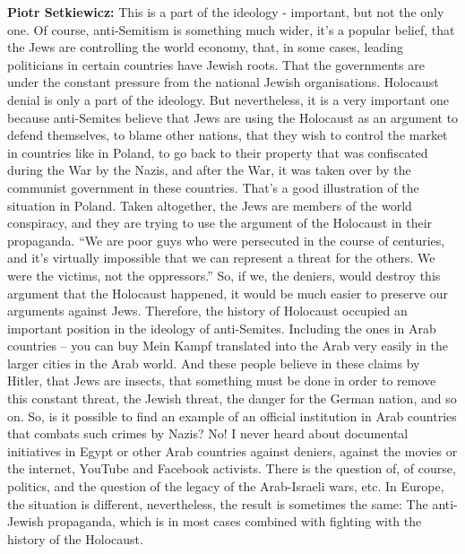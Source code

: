 \textbf{Piotr Setkiewicz:} This is a part of the ideology - important, but not the only one. Of course, anti-Semitism is something much wider, it’s a popular belief, that the Jews are controlling the world economy, that, in some cases, leading politicians in certain countries have Jewish roots. That the governments are under the constant pressure from the national Jewish organisations. Holocaust denial is only a part of the ideology. But nevertheless, it is a very important one because anti-Semites believe that Jews are using the Holocaust as an argument to defend themselves, to blame other nations, that they wish to control the market in countries like in Poland, to go back to their property that was confiscated during the War by the Nazis, and after the War, it was taken over by the communist government in these countries. That’s a good illustration of the situation in Poland. Taken altogether, the Jews are members of the world conspiracy, and they are trying to use the argument of the Holocaust in their propaganda. ``We are poor guys who were persecuted in the course of centuries, and it’s virtually impossible that we can represent a threat for the others. We were the victims, not the oppressors.'' So, if we, the deniers, would destroy this argument that the Holocaust happened, it would be much easier to preserve our arguments against Jews. Therefore, the history of Holocaust occupied an important position in the ideology of anti-Semites. Including the ones in Arab countries – you can buy Mein Kampf translated into the Arab very easily in the larger cities in the Arab world. And these people believe in these claims by Hitler, that Jews are insects, that something must be done in order to remove this constant threat, the Jewish threat, the danger for the German nation, and so on. So, is it possible to find an example of an official institution in Arab countries that combats such crimes by Nazis? No! I never heard about documental initiatives in Egypt or other Arab countries against deniers, against the movies or the internet, YouTube and Facebook activists. There is the question of, of course, politics, and the question of the legacy of the Arab-Israeli wars, etc. In Europe, the situation is different, nevertheless, the result is sometimes the same: The anti-Jewish propaganda, which is in most cases combined with fighting with the history of the Holocaust. 
